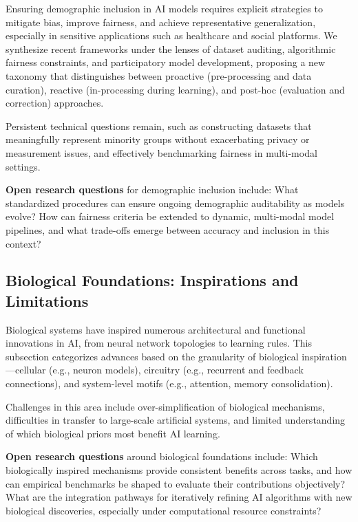 \documentclass[sigconf]{acmart}
\begin{document}
Ensuring demographic inclusion in AI models requires explicit strategies to mitigate bias, improve fairness, and achieve representative generalization, especially in sensitive applications such as healthcare and social platforms. We synthesize recent frameworks under the lenses of dataset auditing, algorithmic fairness constraints, and participatory model development, proposing a new taxonomy that distinguishes between proactive (pre-processing and data curation), reactive (in-processing during learning), and post-hoc (evaluation and correction) approaches.

Persistent technical questions remain, such as constructing datasets that meaningfully represent minority groups without exacerbating privacy or measurement issues, and effectively benchmarking fairness in multi-modal settings.

\textbf{Open research questions} for demographic inclusion include: What standardized procedures can ensure ongoing demographic auditability as models evolve? How can fairness criteria be extended to dynamic, multi-modal model pipelines, and what trade-offs emerge between accuracy and inclusion in this context?

\subsection{Biological Foundations: Inspirations and Limitations}

Biological systems have inspired numerous architectural and functional innovations in AI, from neural network topologies to learning rules. This subsection categorizes advances based on the granularity of biological inspiration—cellular (e.g., neuron models), circuitry (e.g., recurrent and feedback connections), and system-level motifs (e.g., attention, memory consolidation).

Challenges in this area include over-simplification of biological mechanisms, difficulties in transfer to large-scale artificial systems, and limited understanding of which biological priors most benefit AI learning.

\textbf{Open research questions} around biological foundations include: Which biologically inspired mechanisms provide consistent benefits across tasks, and how can empirical benchmarks be shaped to evaluate their contributions objectively? What are the integration pathways for iteratively refining AI algorithms with new biological discoveries, especially under computational resource constraints?
\end{document}
